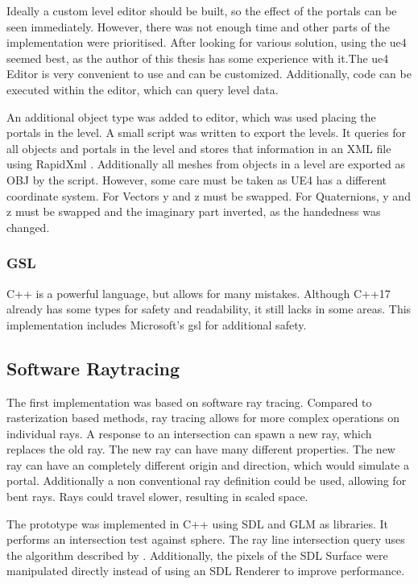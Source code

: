 Ideally a custom level editor should be built, so the effect of the portals can be seen immediately. However, there was not enough time and other parts of the implementation were prioritised. After looking for various solution, using the \gls{ue4} \cite{ue4} seemed best, as the author of this thesis has some experience with it.The \gls{ue4} Editor is very convenient to use and can be customized. Additionally, code can be executed within the editor, which can query level data.

An additional object type was added to editor, which was used placing the portals in the level. A small script was written to export the levels. It queries for all objects and portals in the level and stores that information in an XML file using RapidXml \cite{rapidxml}. Additionally all meshes from objects in a level are exported as OBJ by the script. However, some care must be taken as UE4 has a different coordinate system. For Vectors y and z must be swapped. For Quaternions, y and z must be swapped and the imaginary part inverted, as the handedness was changed.

\subsubsection{GSL}
C++ is a powerful language, but allows for many mistakes. Although C++17 already has some types for safety and readability, it still lacks in some areas. This implementation includes Microsoft's \gls{gsl} \cite{microsoft:gsl} for additional safety.


\subsection{Software Raytracing}
The first implementation was based on software ray tracing. Compared to rasterization based methods, ray tracing allows for more complex operations on individual rays. A response to an intersection can spawn a new ray, which replaces the old ray. The new ray can have many different properties. The new ray can have an completely different origin and direction, which would simulate a portal. Additionally a non conventional ray definition could be used, allowing for bent rays. Rays could travel slower, resulting in scaled space.

The prototype was implemented in C++ using SDL \cite{sdl} and GLM \cite{glm} as libraries. It performs an intersection test against sphere. The ray line intersection query uses the algorithm described by \textcite{eberly:2006:3d}. Additionally, the pixels of the SDL Surface were manipulated directly instead of using an SDL Renderer to improve performance.

